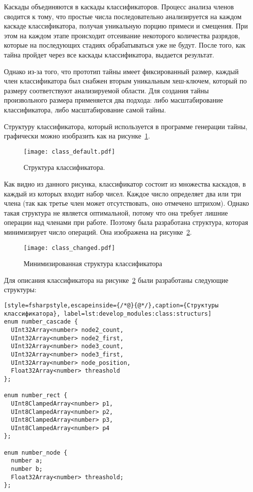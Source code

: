 Каскады объединяются в каскады классификаторов. Процесс анализа членов сводится к тому, что простые числа последовательно анализируется на каждом каскаде классификатора, получая уникальную порцию примеси и смещения. При этом на каждом этапе происходит отсеивание некоторого количества разрядов, которые на последующих стадиях обрабатываться уже не будут. После того, как тайна пройдет через все каскады классификатора, выдается результат.

Однако из-за того, что прототип тайны имеет фиксированный размер, каждый член классификатора был снабжен вторым уникальным хеш-ключем, который по размеру соответствуют анализируемой области. Для создания тайны произвольного размера применяется два подхода: либо масштабирование классификатора, либо масштабирование самой тайны.

Структуру классификатора, который используется в программе генерации тайны, графически можно изобразить как на рисунке~\ref{fig:develop_modules:class:class_default}.

\begin{figure}[ht]
\centering
  \texttt{[image: class\_default.pdf]}
  \caption{ Структура классификатора. }
  \label{fig:develop_modules:class:class_default}
\end{figure}

Как видно из данного рисунка, классификатор состоит из множества каскадов, в каждый из которых входит набор чисел. Каждое число определяет два или три члена (так как третье член может отсутствовать, оно отмечено штрихом). Однако такая структура не является оптимальной, потому что она требует лишние операции над членами при работе. Поэтому была разработана структура, которая минимизирует число операций. Она изображена на рисунке~\ref{fig:develop_modules:class:class_changed}.

\begin{figure}[ht]
\centering
  \texttt{[image: class\_changed.pdf]}
  \caption{ Минимизированная структура классификатора }
  \label{fig:develop_modules:class:class_changed}
\end{figure}

Для описания классификатора на рисунке~\ref{fig:develop_modules:class:class_changed} были разработаны следующие структуры:

\begin{lstlisting}[style=fsharpstyle,escapeinside={/*@}{@*/},caption={Структуры классификатора}, label=lst:develop_modules:class:structurs]
enum number_cascade {
  UInt32Array<number> node2_count,
  UInt32Array<number> node2_first,
  UInt32Array<number> node3_count,
  UInt32Array<number> node3_first,
  UInt32Array<number> node_position,
  Float32Array<number> threashold
};

enum number_rect {
  UInt8ClampedArray<number> p1,
  UInt8ClampedArray<number> p2,
  UInt8ClampedArray<number> p3,
  UInt8ClampedArray<number> p4
};

enum number_node {
  number a;
  number b;
  Float32Array<number> threashold;
};
\end{lstlisting}

